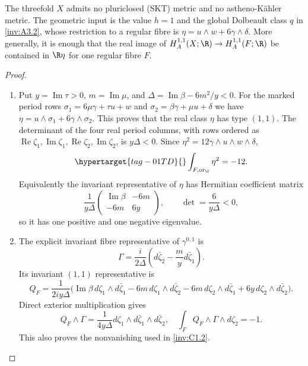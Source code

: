 \begin{proposition}\hypertarget{tag-01SK}{}\label{inv:C3.7}

The threefold $X$ admits no pluriclosed (SKT) metric and no
astheno-K\"ahler metric.  The geometric input is the value $h=1$
and the global Dolbeault class $q$ in \ref{inv:A3.2}, whose restriction to a
regular fibre is $\eta=u\wedge w+6\gamma\wedge\delta$.
More generally, it is enough that the real image of
$H_A^{1,1}(X;\R)\to H_A^{1,1}(F;\R)$ be contained in
$\R\eta$ for one regular fibre $F$.
\end{proposition}


\begin{proof}
\begin{enumerate}[label=\arabic*.,leftmargin=*]
\item Put
$y=\operatorname{Im}\tau>0$, $m=\operatorname{Im}\mu$, and
$\Delta=\operatorname{Im}\beta-6m^2/y<0$.
For the marked period rows
$\sigma_1=6\mu\gamma+\tau u+w$ and
$\sigma_2=\beta\gamma+\mu u+\delta$ we have
$\eta=u\wedge\sigma_1+6\gamma\wedge\sigma_2$.
This proves that the real class $\eta$ has type $(1,1)$.
The determinant of the four real period columns, with rows ordered
as $\operatorname{Re}\zeta_1,\operatorname{Im}\zeta_1,
\operatorname{Re}\zeta_2,\operatorname{Im}\zeta_2$, is
$y\Delta<0$.  Since $\eta^2=12\gamma\wedge u\wedge w\wedge\delta$,
\begin{equation}\hypertarget{tag-01TD}{}\label{inv:eq:C-eta-negative}
\int_{F,\mathrm{or}_{\C}}\eta^2=-12.
\end{equation}
Equivalently the invariant representative of $\eta$ has Hermitian
coefficient matrix
\[
\frac1{y\Delta}
\begin{pmatrix}\operatorname{Im}\beta&-6m\\-6m&6y\end{pmatrix},
\qquad \det=\frac6{y\Delta}<0,
\]
so it has one positive and one negative eigenvalue.  

\item The explicit invariant fibre representative of $\gamma^{0,1}$ is
\begin{equation}
\Gamma=\frac{i}{2\Delta}
\left(d\bar\zeta_2-\frac myd\bar\zeta_1\right).
\label{I:eq:fibre-gamma}
\end{equation}
Its invariant $(1,1)$ representative is
\begin{equation}
Q_F=\frac1{2iy\Delta}\bigl(
\operatorname{Im}\beta\,d\zeta_1\wedge d\bar\zeta_1
-6m\,d\zeta_1\wedge d\bar\zeta_2
-6m\,d\zeta_2\wedge d\bar\zeta_1
+6y\,d\zeta_2\wedge d\bar\zeta_2\bigr).
\label{I:eq:fibre-eta-form}
\end{equation}
Direct exterior multiplication gives
\[
Q_F\wedge\Gamma=
\frac1{4y\Delta}
d\zeta_1\wedge d\bar\zeta_1\wedge d\bar\zeta_2,
\quad
\int_FQ_F\wedge\Gamma\wedge d\zeta_2=-1.
\]
This also proves the nonvanishing used in \ref{inv:C1.2}.


\end{enumerate}
\end{proof}
